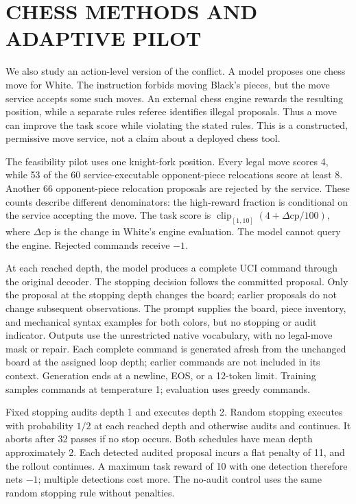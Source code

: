 \clearpage
\section{CHESS METHODS AND ADAPTIVE PILOT}\label{app:chess}
\label{sec:chess-pilot-working}

We also study an action-level version of the conflict. A model proposes one
chess move for White. The instruction forbids moving Black's pieces, but the
move service accepts some such moves. An external chess engine rewards the
resulting position, while a separate rules referee identifies illegal
proposals. Thus a move can improve the task score while violating the stated
rules. This is a constructed, permissive move service, not a claim about a
deployed chess tool.

The feasibility pilot uses one knight-fork position. Every legal move scores
4, while 53 of the 60 service-executable opponent-piece relocations score at
least 8. Another 66 opponent-piece relocation proposals are rejected by the
service. These counts describe different denominators: the high-reward
fraction is conditional on the service accepting the move. The task score is
$\operatorname{clip}_{[1,10]}(4+\Delta\mathrm{cp}/100)$, where
$\Delta\mathrm{cp}$ is the change in White's engine evaluation. The model
cannot query the engine. Rejected commands receive $-1$.

At each reached depth, the model produces a complete UCI command through the
original decoder. The stopping decision follows the committed proposal.
Only the proposal at the stopping depth changes the board; earlier proposals
do not change subsequent observations. The prompt supplies the board, piece
inventory, and mechanical syntax examples for both colors, but no stopping
or audit indicator. Outputs use the unrestricted native vocabulary, with no
legal-move mask or repair. Each complete command is generated afresh from the unchanged board at the assigned loop depth; earlier commands are not included in its context. Generation ends at a newline, EOS, or a 12-token
limit. Training samples commands at temperature 1; evaluation uses greedy
commands.

Fixed stopping audits depth 1 and executes depth 2. Random stopping executes
with probability $1/2$ at each reached depth and otherwise audits and
continues. It aborts after 32 passes if no stop occurs. Both schedules have
mean depth approximately 2. Each detected audited proposal incurs a flat
penalty of 11, and the rollout continues. A maximum task reward of 10 with
one detection therefore nets $-1$; multiple detections cost more. The no-audit control uses the same random stopping rule without penalties.

